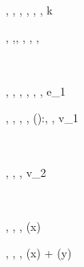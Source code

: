 \begin{figure}[t!]  

\footnotesize
\begin{minipage}{0.335\textwidth}
        {\rho, \stk, \heap,   
          \rightsquigarrow \rho, \stk, \heap, k}
\end{minipage}\begin{minipage}{0.655\textwidth}
      {\rho, \ell \bullet \stk,\heap, 
        \rightsquigarrow \rho, \stk, ,
        \ell}
\end{minipage} \\[0.5ex]

\begin{minipage}{0.395\textwidth}
        {\rho, \stk, \heap, 
          \rightsquigarrow \rho, \stk, \heap, e_1}
\end{minipage}
\begin{minipage}{0.395\textwidth}
        {\rho, \stk, \heap, 
          \rightsquigarrow \rho, (\CAR \bullet):\stk, \heap, v_1}
\end{minipage}\\[0.5ex]





\begin{minipage}{0.595\textwidth}
        {\rho, \heap, 
          \rightsquigarrow \heap, v_2}
\end{minipage} \\[0.5ex]

\begin{minipage}{0.395\textwidth}
\infrule[ord-id]
      {
}
      {\rho, \heap, 
        \rightsquigarrow \heap, \rho(x)}
\end{minipage}\begin{minipage}{0.595\textwidth}
      {\rho, \heap, 
        \rightsquigarrow \heap, \rho(x) + \rho(y)}
\end{minipage} \\[0.5ex]


\end{figure}
